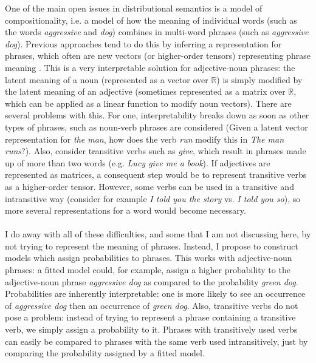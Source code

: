 \documentclass[11pt]{article}
\begin{document}
One of the main open issues in distributional semantics is a model of compositionality, i.e. a model of how the meaning of individual words (such as the words \emph{aggressive} and \emph{dog}) combines in multi-word phrases (such as \emph{aggressive dog}). Previous approaches tend to do this by inferring a representation for phrases, which often are new vectors (or higher-order tensors) representing phrase meaning \cite{Baroni2010a,Guevara2010,Clarke2011,Baroni2010,Clark2008}. This is a very interpretable solution for adjective-noun phrases: the latent meaning of a noun (represented as a vector over $\mathbb{R}$) is simply modified by the latent meaning of an adjective (sometimes represented as a matrix over $\mathbb{R}$, which can be applied as a linear function to modify noun vectors). There are several problems with this. For one, interpretability breaks down as soon as other types of phrases, such as noun-verb phrases are considered (Given a latent vector representation for \emph{the man}, how does the verb \emph{run} modify this in \emph{The man runs}?). Also, consider transitive verbs such as \emph{give}, which result in phrases made up of more than two words (e.g. \emph{Lucy give me a book}). If adjectives are represented as matrices, a consequent step would be to represent transitive verbs as a higher-order tensor. However, some verbs can be used in a transitive and intransitive way (consider for example \emph{I told you the story} vs. \emph{I told you so}), so more several representations for a word would become necessary.\\
\\
I do away with all of these difficulties, and some that I am not discussing here, by not trying to represent the meaning of phrases. Instead, I propose to construct models which assign probabilities to phrases. This works with adjective-noun phrases: a fitted model could, for example, assign a higher probability to the adjective-noun phrase \emph{aggressive dog} as compared to the probability \emph{green dog}. Probabilities are inherently interpretable: one is more likely to see an occurrence of \emph{aggressive dog} then an occurrence of \emph{green dog}. Also, transitive verbs do not pose a problem: instead of trying to represent a phrase containing a transitive verb, we simply assign a probability to it. Phrases with transitively used verbs can easily be compared to phrases with the same verb used intransitively, just by comparing the probability assigned by a fitted model.\\
\end{document}
